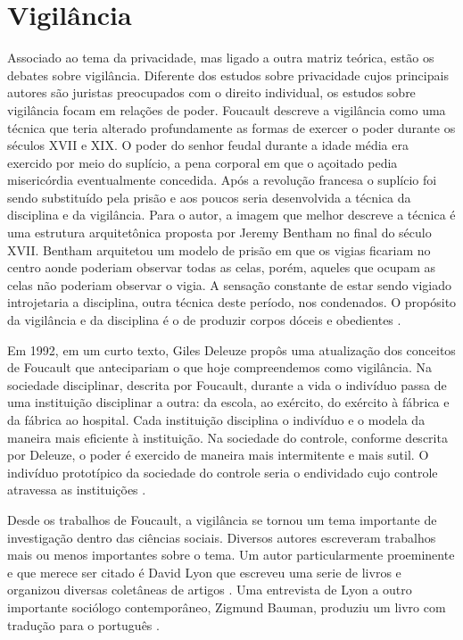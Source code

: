 \section{Vigilância}
\label{sec:vigilancia}

Associado ao tema da privacidade, mas ligado a outra matriz teórica, estão os debates sobre vigilância.
Diferente dos estudos sobre privacidade cujos principais autores são juristas preocupados com o direito individual, os estudos sobre vigilância focam em relações de poder.
Foucault descreve a vigilância como uma técnica que teria alterado profundamente as formas de exercer o poder durante os séculos XVII e XIX.
O poder do senhor feudal durante a idade média era exercido por meio do suplício, a pena corporal em que o açoitado pedia misericórdia eventualmente concedida.
Após a revolução francesa o suplício foi sendo substituído pela prisão e aos poucos seria desenvolvida a técnica da disciplina e da vigilância.
Para o autor, a imagem que melhor descreve a técnica é uma estrutura arquitetônica proposta por Jeremy Bentham no final do século XVII.
Bentham arquitetou um modelo de prisão em que os vigias ficariam no centro aonde poderiam observar todas as celas, porém, aqueles que ocupam as celas não poderiam observar o vigia.
A sensação constante de estar sendo vigiado introjetaria a disciplina, outra técnica deste período, nos condenados.
O propósito da vigilância e da disciplina é o de produzir corpos dóceis e obedientes \cite{Foucault96}.

Em 1992, em um curto texto, Giles Deleuze propôs uma atualização dos conceitos de Foucault que antecipariam o que hoje compreendemos como vigilância.
Na sociedade disciplinar, descrita por Foucault, durante a vida o indivíduo passa de uma instituição disciplinar a outra: da escola, ao exército, do exército à fábrica e da fábrica ao hospital.
Cada instituição disciplina o indivíduo e o modela da maneira mais eficiente à instituição.
Na sociedade do controle, conforme descrita por Deleuze, o poder é exercido de maneira mais intermitente e mais sutil.
O indivíduo prototípico da sociedade do controle seria o endividado cujo controle atravessa as instituições \cite{Deleuze92}.

Desde os trabalhos de Foucault, a vigilância se tornou um tema importante de investigação dentro das ciências sociais.
Diversos autores escreveram trabalhos mais ou menos importantes sobre o tema.
Um autor particularmente proeminente e que merece ser citado é David Lyon que escreveu uma serie de livros e organizou diversas coletâneas de artigos \cite{Lyon94,Lyon05}.
Uma entrevista de Lyon a outro importante sociólogo contemporâneo, Zigmund Bauman, produziu um livro com tradução para o português \cite{Bauman14}. 

